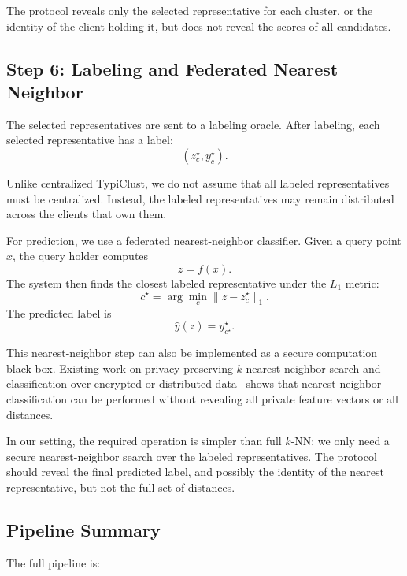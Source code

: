 \documentclass{article}
\begin{document}
The protocol reveals only the selected representative for each cluster, or the identity of the client holding it, but does not reveal the scores of all candidates.

\subsection{Step 6: Labeling and Federated Nearest Neighbor}

The selected representatives are sent to a labeling oracle. After labeling, each selected representative has a label:
\[
    (z_c^\star, y_c^\star).
\]

Unlike centralized TypiClust, we do not assume that all labeled representatives must be centralized. Instead, the labeled representatives may remain distributed across the clients that own them.

For prediction, we use a federated nearest-neighbor classifier. Given a query point $x$, the query holder computes
\[
    z = f(x).
\]
The system then finds the closest labeled representative under the $L_1$ metric:
\[
    c^\star
    =
    \arg\min_c
    \|z-z_c^\star\|_1.
\]
The predicted label is
\[
    \hat{y}(z)
    =
    y_{c^\star}^\star.
\]

This nearest-neighbor step can also be implemented as a secure computation black box. Existing work on privacy-preserving $k$-nearest-neighbor search and classification over encrypted or distributed data~\cite{wong2009secure,elmehdwi2014secure} shows that nearest-neighbor classification can be performed without revealing all private feature vectors or all distances.

In our setting, the required operation is simpler than full $k$-NN: we only need a secure nearest-neighbor search over the labeled representatives. The protocol should reveal the final predicted label, and possibly the identity of the nearest representative, but not the full set of distances.

\subsection{Pipeline Summary}

The full pipeline is:
\end{document}
